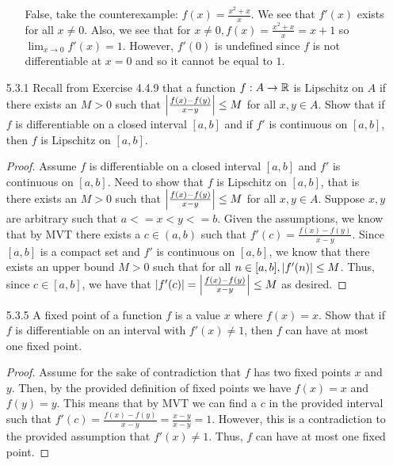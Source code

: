 \documentclass[12pt,letterpaper]{article}
\begin{document}
\begin{itemize}[leftmargin=!,labelindent=5pt]
\begin{itemize}
                        False, take the counterexample: $f(x) = \frac{x^2 + x}{x}$.
                        We see that $f'(x)$ exists for all $x \neq 0$.
                        Also, we see that for $x \neq 0, f(x) = \frac{x^2 + x}{x} = x+1$ so $\lim_{x \to 0} f'(x) = 1$.
                        However, $f'(0)$ is undefined since $f$ is not differentiable at $x=0$ and so it cannot be equal to $1$.
            \end{itemize}
        \item [5.3.1] Recall from Exercise 4.4.9 that a function $f : A \to \mathbb{R}$ is Lipschitz on $A$ if there exists an $M > 0$ such that $\abs{\frac{f(x) - f(y)}{x-y}} \leq M$ for all $x,y \in A$. Show that if $f$ is differentiable on a closed interval $[a, b]$ and if $f'$ is continuous on $[a,b]$, then $f$ is Lipschitz on $[a,b]$.
            \begin{proof}
                Assume $f$ is differentiable on a closed interval $[a, b]$ and $f'$ is continuous on $[a,b]$.
                Need to show that $f$ is Lipschitz on $[a,b]$, that is there exists an $M > 0$ such that $\abs{\frac{f(x) - f(y)}{x-y}} \leq M$ for all $x,y \in A$.
                Suppose $x,y$ are arbitrary such that $a <= x < y <= b$.
                Given the assumptions, we know that by MVT there exists a $c \in (a,b)$ such that $f'(c) = \frac{f(x) - f(y)}{x-y}$.
                Since $[a,b]$ is a compact set and $f'$ is continuous on $[a,b]$, we know that there exists an upper bound $M > 0$ such that for all $n \in [a,b], \abs{f'(n)} \leq M$.
                Thus, since $c \in [a,b]$, we have that $\abs{f'(c)} = \abs{\frac{f(x) - f(y)}{x-y}} \leq M$ as desired.
            \end{proof}
        \item [5.3.5] A fixed point of a function $f$ is a value $x$ where $f(x) = x$. Show that if $f$ is differentiable on an interval with $f'(x) \neq 1$, then $f$ can have at most one fixed point.
            \begin{proof}
                Assume for the sake of contradiction that $f$ has two fixed points $x$ and $y$.
                Then, by the provided definition of fixed points we have $f(x) = x$ and $f(y) = y$.
                This means that by MVT we can find a $c$ in the provided interval such that $f'(c) = \frac{f(x) - f(y)}{x-y} = \frac{x-y}{x-y} = 1$.
                However, this is a contradiction to the provided assumption that $f'(x) \neq 1$.
                Thus, $f$ can have at most one fixed point.
            \end{proof}

\end{itemize}
\end{document}
